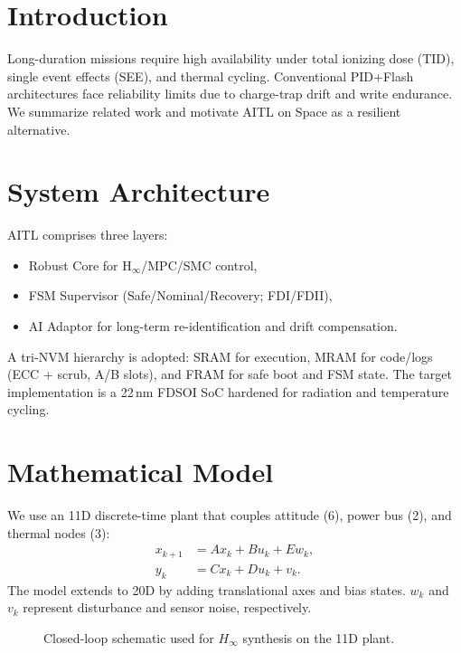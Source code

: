 \documentclass[conference]{IEEEtran}
\begin{document}
\section{Introduction}
Long-duration missions require high availability under total ionizing dose (TID), single event effects (SEE), and thermal cycling. Conventional PID+Flash architectures face reliability limits due to charge-trap drift and write endurance. We summarize related work and motivate AITL on Space as a resilient alternative.

\section{System Architecture}
AITL comprises three layers:
\begin{itemize}
  \item Robust Core for H$_\infty$/MPC/SMC control,
  \item FSM Supervisor (Safe/Nominal/Recovery; FDI/FDII),
  \item AI Adaptor for long-term re-identification and drift compensation.
\end{itemize}
A tri-NVM hierarchy is adopted: SRAM for execution, MRAM for code/logs (ECC + scrub, A/B slots), and FRAM for safe boot and FSM state. The target implementation is a 22\,nm FDSOI SoC hardened for radiation and temperature cycling.

\section{Mathematical Model}
We use an 11D discrete-time plant that couples attitude (6), power bus (2), and thermal nodes (3):
\begin{align}
x_{k+1} &= A x_k + B u_k + E w_k, \\
y_k &= C x_k + D u_k + v_k.
\end{align}
The model extends to 20D by adding translational axes and bias states. $w_k$ and $v_k$ represent disturbance and sensor noise, respectively.

\begin{figure}[!t]
\centering
{}
\caption{Closed-loop schematic used for \(H_\infty\) synthesis on the 11D plant.}
\label{fig:cl}
\end{figure}
\end{document}
